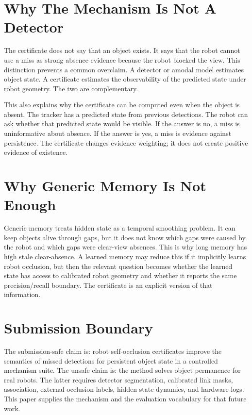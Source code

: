 \documentclass{article}
\begin{document}
\section{Why The Mechanism Is Not A Detector}

The certificate does not say that an object exists. It says that the robot
cannot use a miss as strong absence evidence because the robot blocked the
view. This distinction prevents a common overclaim. A detector or amodal model
estimates object state. A certificate estimates the observability of the
predicted state under robot geometry. The two are complementary.

This also explains why the certificate can be computed even when the object is
absent. The tracker has a predicted state from previous detections. The robot
can ask whether that predicted state would be visible. If the answer is no, a
miss is uninformative about absence. If the answer is yes, a miss is evidence
against persistence. The certificate changes evidence weighting; it does not
create positive evidence of existence.

\section{Why Generic Memory Is Not Enough}

Generic memory treats hidden state as a temporal smoothing problem. It can keep
objects alive through gaps, but it does not know which gaps were caused by the
robot and which gaps were clear-view absences. This is why long memory has high
stale clear-absence. A learned memory may reduce this if it implicitly learns
robot occlusion, but then the relevant question becomes whether the learned
state has access to calibrated robot geometry and whether it reports the same
precision/recall boundary. The certificate is an explicit version of that
information.

\section{Submission Boundary}

The submission-safe claim is: robot self-occlusion certificates improve the
semantics of missed detections for persistent object state in a controlled
mechanism suite. The unsafe claim is: the method solves object permanence for
real robots. The latter requires detector segmentation, calibrated link masks,
association, external occlusion labels, hidden-state dynamics, and hardware
logs. This paper supplies the mechanism and the evaluation vocabulary for that
future work.
\end{document}

